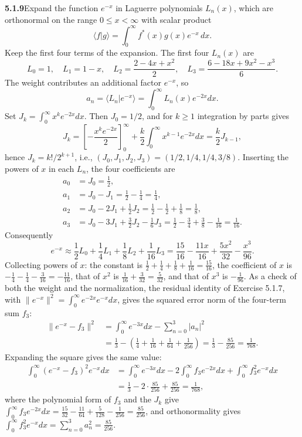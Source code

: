 \par\bigskip
\noindent\textbf{5.1.9}\quad Expand the function $e^{-x}$ in Laguerre
polynomials $L_{n}(x)$, which are orthonormal on the range $0\le x<\infty$
with scalar product
\[
\langle f|g\rangle=\int_{0}^{\infty}f^{*}(x)g(x)e^{-x}\,dx.
\]
Keep the first four terms of the expansion. The first four $L_{n}(x)$ are
\[
L_{0}=1,\quad L_{1}=1-x,\quad L_{2}=\frac{2-4x+x^{2}}{2},\quad
L_{3}=\frac{6-18x+9x^{2}-x^{3}}{6}.
\]
\solution
The weight contributes an additional factor $e^{-x}$, so
\[
a_n=\langle L_n|e^{-x}\rangle=\int_0^\infty L_n(x)e^{-2x}dx.
\]
Set $J_k=\int_0^\infty x^ke^{-2x}dx$. Then $J_0=1/2$, and for $k\ge1$
integration by parts gives
\[
J_k=\left[-\frac{x^ke^{-2x}}{2}\right]_0^\infty
 +\frac k2\int_0^\infty x^{k-1}e^{-2x}dx=\frac k2J_{k-1},
\]
hence $J_k=k!/2^{k+1}$, i.e., $(J_0,J_1,J_2,J_3)=(1/2,1/4,1/4,3/8)$.
Inserting the powers of $x$ in each $L_n$, the four coefficients are
\begin{align*}
a_0&=J_0=\frac12,\\
a_1&=J_0-J_1=\frac12-\frac14=\frac14,\\
a_2&=J_0-2J_1+\frac12J_2
=\frac12-\frac12+\frac18=\frac18,\\
a_3&=J_0-3J_1+\frac32J_2-\frac16J_3
=\frac12-\frac34+\frac38-\frac1{16}=\frac1{16}.
\end{align*}
Consequently
\[
\boxed{e^{-x}\approx\frac12L_0+\frac14L_1+\frac18L_2+\frac1{16}L_3
=\frac{15}{16}-\frac{11x}{16}+\frac{5x^2}{32}-\frac{x^3}{96}}.
\]
Collecting powers of $x$: the constant is
$\frac12+\frac14+\frac18+\frac1{16}=\frac{15}{16}$, the coefficient of $x$ is
$-\frac14-\frac14-\frac3{16}=-\frac{11}{16}$, that of $x^2$ is
$\frac1{16}+\frac3{32}=\frac5{32}$, and that of $x^3$ is $-\frac1{96}$.
As a check of both the weight and the normalization, the residual identity
of Exercise 5.1.7, with $\|e^{-x}\|^2=\int_0^\infty e^{-2x}e^{-x}dx$, gives
the squared error norm of the four-term sum $f_3$:
\begin{align*}
\|e^{-x}-f_3\|^2
&=\int_0^\infty e^{-3x}dx-\sum_{n=0}^3|a_n|^2\\
&=\frac13-\left(\frac14+\frac1{16}+\frac1{64}+\frac1{256}\right)
=\frac13-\frac{85}{256}=\frac1{768}.
\end{align*}
Expanding the square gives the same value:
\begin{align*}
\int_0^\infty(e^{-x}-f_3)^2e^{-x}dx
&=\int_0^\infty e^{-3x}dx-2\int_0^\infty f_3e^{-2x}dx
 +\int_0^\infty f_3^2e^{-x}dx\\
&=\frac13-2\cdot\frac{85}{256}+\frac{85}{256}=\frac1{768},
\end{align*}
where the polynomial form of $f_3$ and the $J_k$ give
$\int_0^\infty f_3e^{-2x}dx
=\frac{15}{32}-\frac{11}{64}+\frac5{128}-\frac1{256}=\frac{85}{256}$, and
orthonormality gives
$\int_0^\infty f_3^2e^{-x}dx=\sum_{n=0}^3a_n^2=\frac{85}{256}$.

